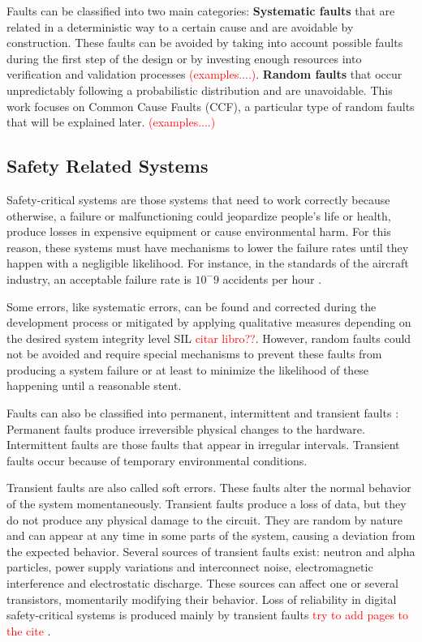 Faults can be classified into two main categories: \textbf{Systematic faults} that are related in a deterministic way to a certain cause and are avoidable by construction. These faults can be avoided by taking into account possible faults during the first step of the design or by investing enough resources into verification and validation processes \textcolor{red}{(examples....)}. \textbf{Random faults} that occur unpredictably following a probabilistic distribution and are unavoidable. This work focuses on Common Cause Faults (CCF), a particular type of random faults that will be explained later. \textcolor{red}{(examples....)}

\bigskip


\subsection{Safety Related Systems}

Safety-critical systems are those systems that need to work correctly because otherwise, a failure or malfunctioning could jeopardize people's life or health, produce losses in expensive equipment or cause environmental harm. For this reason, these systems must have mechanisms to lower the failure rates until they happen with a negligible likelihood. For instance, in the standards of the aircraft industry, an acceptable failure rate is $10^-9$ accidents per hour \cite{bowen2000ethics}.

Some errors, like systematic errors, can be found and corrected during the development process or mitigated by applying qualitative measures depending on the desired system integrity level SIL \textcolor{red}{citar libro??}. However, random faults could not be avoided and require special mechanisms to prevent these faults from producing a system failure or at least to minimize the likelihood of these happening until a reasonable stent.  

Faults can also be classified into permanent, intermittent and transient faults \cite{constantinescu2003trends}: Permanent faults produce irreversible physical changes to the hardware. Intermittent faults are those faults that appear in irregular intervals. Transient faults occur because of temporary environmental conditions. 

Transient faults are also called soft errors. These faults alter the normal behavior of the system momentaneously. Transient faults produce a loss of data, but they do not produce any physical damage to the circuit. They are random by nature and can appear at any time in some parts of the system, causing a deviation from the expected behavior. Several sources of transient faults exist: neutron and alpha particles, power supply variations and interconnect noise, electromagnetic interference and electrostatic discharge. These sources can affect one or several transistors, momentarily modifying their behavior. Loss of reliability in digital safety-critical systems is produced mainly by transient faults \textcolor{red}{try to add pages to the cite} \cite{enso2003fault}. 


